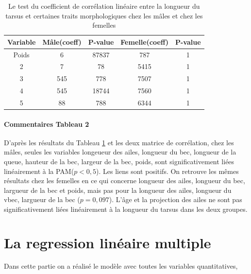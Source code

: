 \documentclass[12pt, twocolumn]{article}
\begin{document}
\begin{table}[h!]
    \centering
    \begin{adjustbox}{width=0.4\textwidth}
    \small
    \begin{tabular}{||c c c c c||} 
     \hline
     Variable & Mâle(coeff) & P-value & Femelle(coeff) & P-value \\ [0.5ex] 
     \hline\hline
     Poids & 6 & 87837 & 787 & 1\\ 
     2 & 7 & 78 & 5415 & 1\\
     3 & 545 & 778 & 7507 & 1\\
     4 & 545 & 18744 & 7560 & 1\\
     5 & 88 & 788 & 6344 & 1\\ [0.5ex] 
     \hline
    \end{tabular}
\end{adjustbox}
    \caption{Le test du coefficient de corrélation linéaire entre la longueur du tarsus et certaines traits morphologiques chez les mâles et chez les femelles}
    \label{table:2}
\end{table}

\paragraph{Commentaires Tableau 2}

D'après les résultats du Tableau \ref{table:2} et les deux matrice de corrélation, chez les mâles, seules les variables longeueur des ailes, longueur du bec, longueur de la queue, hauteur de la bec, largeur
de la bec, poids, sont significativement liées linéairement à la PAM($ p < 0,5 $). Les liens sont positifs. On retrouve les mêmes résultats chez les femelles en ce qui concerne longueur des ailes, longueur du bec, largueur de la bec et poids,
mais pas pour la longueur des ailes, longueur du vbec, largueur de la bec ($p = 0,097$). L'âge et la projection des ailes ne sont pas significativement liées linéairement à la longueur du tarsus dans les deux groupes.

\section{La regression linéaire multiple}
Dans cette partie on a réalisé le modèle avec toutes les variables quantitatives, 
\end{document}
